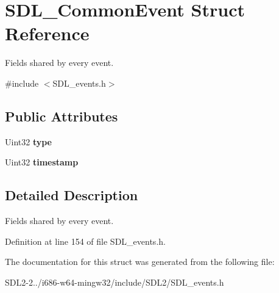 \hypertarget{structSDL__CommonEvent}{\section{S\+D\+L\+\_\+\+Common\+Event Struct Reference}
\label{structSDL__CommonEvent}
}


Fields shared by every event.  




{\ttfamily \#include $<$S\+D\+L\+\_\+events.\+h$>$}

\subsection*{Public Attributes}
\begin{DoxyCompactItemize}
\item 
\hypertarget{structSDL__CommonEvent_a4ecd888325355321b42b2e2956f27453}{Uint32 {\bfseries type}}\label{structSDL__CommonEvent_a4ecd888325355321b42b2e2956f27453}

\item 
\hypertarget{structSDL__CommonEvent_a7d9046abb021ffc88dd5d32978289e65}{Uint32 {\bfseries timestamp}}\label{structSDL__CommonEvent_a7d9046abb021ffc88dd5d32978289e65}

\end{DoxyCompactItemize}


\subsection{Detailed Description}
Fields shared by every event. 

Definition at line 154 of file S\+D\+L\+\_\+events.\+h.



The documentation for this struct was generated from the following file\+:\begin{DoxyCompactItemize}
\item 
S\+D\+L2-\/2../i686-\/w64-\/mingw32/include/\+S\+D\+L2/S\+D\+L\+\_\+events.\+h\end{DoxyCompactItemize}
